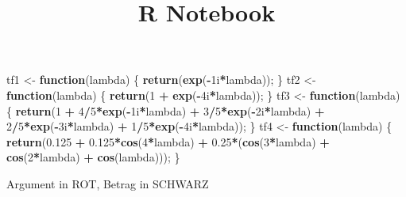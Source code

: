 \documentclass[]{article}
\title{R Notebook}
\author{}
\date{}
\newenvironment{Shaded}{\begin{snugshade}}{\end{snugshade}}
\newcommand{\KeywordTok}[1]{\textcolor[rgb]{0.13,0.29,0.53}{\textbf{#1}}}
\newcommand{\DecValTok}[1]{\textcolor[rgb]{0.00,0.00,0.81}{#1}}
\newcommand{\FloatTok}[1]{\textcolor[rgb]{0.00,0.00,0.81}{#1}}
\newcommand{\StringTok}[1]{\textcolor[rgb]{0.31,0.60,0.02}{#1}}
\newcommand{\ControlFlowTok}[1]{\textcolor[rgb]{0.13,0.29,0.53}{\textbf{#1}}}
\newcommand{\OperatorTok}[1]{\textcolor[rgb]{0.81,0.36,0.00}{\textbf{#1}}}
\newcommand{\NormalTok}[1]{#1}
\begin{document}
\maketitle

\begin{Shaded}
\begin{Highlighting}[]
\NormalTok{tf1 <-}\StringTok{ }\ControlFlowTok{function}\NormalTok{(lambda) \{}
  \KeywordTok{return}\NormalTok{(}\KeywordTok{exp}\NormalTok{(}\OperatorTok{-}\NormalTok{1i}\OperatorTok{*}\NormalTok{lambda));}
\NormalTok{\}}
\NormalTok{tf2 <-}\StringTok{ }\ControlFlowTok{function}\NormalTok{(lambda) \{}
  \KeywordTok{return}\NormalTok{(}\DecValTok{1} \OperatorTok{+}\StringTok{ }\KeywordTok{exp}\NormalTok{(}\OperatorTok{-}\NormalTok{4i}\OperatorTok{*}\NormalTok{lambda));}
\NormalTok{\}}
\NormalTok{tf3 <-}\StringTok{ }\ControlFlowTok{function}\NormalTok{(lambda) \{}
  \KeywordTok{return}\NormalTok{(}\DecValTok{1} \OperatorTok{+}\StringTok{ }\DecValTok{4}\OperatorTok{/}\DecValTok{5}\OperatorTok{*}\KeywordTok{exp}\NormalTok{(}\OperatorTok{-}\NormalTok{1i}\OperatorTok{*}\NormalTok{lambda) }\OperatorTok{+}\StringTok{ }\DecValTok{3}\OperatorTok{/}\DecValTok{5}\OperatorTok{*}\KeywordTok{exp}\NormalTok{(}\OperatorTok{-}\NormalTok{2i}\OperatorTok{*}\NormalTok{lambda) }\OperatorTok{+}\StringTok{ }\DecValTok{2}\OperatorTok{/}\DecValTok{5}\OperatorTok{*}\KeywordTok{exp}\NormalTok{(}\OperatorTok{-}\NormalTok{3i}\OperatorTok{*}\NormalTok{lambda) }\OperatorTok{+}\StringTok{ }\DecValTok{1}\OperatorTok{/}\DecValTok{5}\OperatorTok{*}\KeywordTok{exp}\NormalTok{(}\OperatorTok{-}\NormalTok{4i}\OperatorTok{*}\NormalTok{lambda));}
\NormalTok{\}}
\NormalTok{tf4 <-}\StringTok{ }\ControlFlowTok{function}\NormalTok{(lambda) \{}
  \KeywordTok{return}\NormalTok{(}\FloatTok{0.125} \OperatorTok{+}\StringTok{ }\FloatTok{0.125}\OperatorTok{*}\KeywordTok{cos}\NormalTok{(}\DecValTok{4}\OperatorTok{*}\NormalTok{lambda) }\OperatorTok{+}\StringTok{ }\FloatTok{0.25}\OperatorTok{*}\NormalTok{(}\KeywordTok{cos}\NormalTok{(}\DecValTok{3}\OperatorTok{*}\NormalTok{lambda) }\OperatorTok{+}\StringTok{ }\KeywordTok{cos}\NormalTok{(}\DecValTok{2}\OperatorTok{*}\NormalTok{lambda) }\OperatorTok{+}\StringTok{ }\KeywordTok{cos}\NormalTok{(lambda)));}
\NormalTok{\}}
\end{Highlighting}
\end{Shaded}

Argument in ROT, Betrag in SCHWARZ
\end{document}
